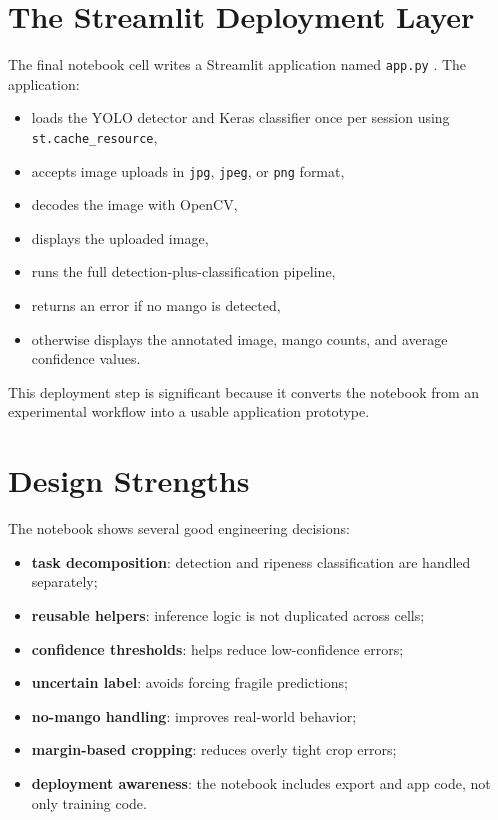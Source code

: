 \documentclass[12pt,a4paper]{article}
\begin{document}
\section{The Streamlit Deployment Layer}
The final notebook cell writes a Streamlit application named \texttt{app.py} \cite{streamlit}. The application:
\begin{itemize}
    \item loads the YOLO detector and Keras classifier once per session using \texttt{st.cache\_resource},
    \item accepts image uploads in \texttt{jpg}, \texttt{jpeg}, or \texttt{png} format,
    \item decodes the image with OpenCV,
    \item displays the uploaded image,
    \item runs the full detection-plus-classification pipeline,
    \item returns an error if no mango is detected,
    \item otherwise displays the annotated image, mango counts, and average confidence values.
\end{itemize}

This deployment step is significant because it converts the notebook from an experimental workflow into a usable application prototype.

\section{Design Strengths}
The notebook shows several good engineering decisions:
\begin{itemize}
    \item \textbf{task decomposition}: detection and ripeness classification are handled separately;
    \item \textbf{reusable helpers}: inference logic is not duplicated across cells;
    \item \textbf{confidence thresholds}: helps reduce low-confidence errors;
    \item \textbf{uncertain label}: avoids forcing fragile predictions;
    \item \textbf{no-mango handling}: improves real-world behavior;
    \item \textbf{margin-based cropping}: reduces overly tight crop errors;
    \item \textbf{deployment awareness}: the notebook includes export and app code, not only training code.
\end{itemize}
\end{document}

